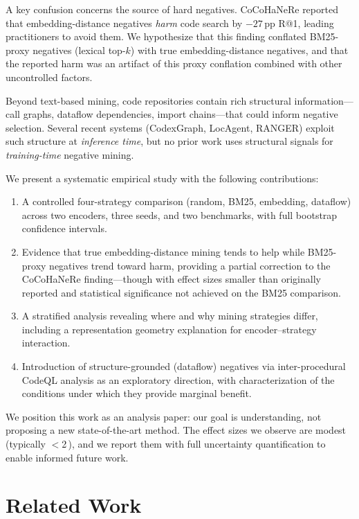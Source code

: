 \documentclass[11pt]{article}
\newcommand{\pp}{\,\text{pp}}
\begin{document}
A key confusion concerns the source of hard negatives.
CoCoHaNeRe reported that embedding-distance negatives \emph{harm} code search by $-27\pp{}$ R@1, leading practitioners to avoid them.
We hypothesize that this finding conflated BM25-proxy negatives (lexical top-$k$) with true embedding-distance negatives, and that the reported harm was an artifact of this proxy conflation combined with other uncontrolled factors.

Beyond text-based mining, code repositories contain rich structural information---call graphs, dataflow dependencies, import chains---that could inform negative selection.
Several recent systems (CodexGraph, LocAgent, RANGER) exploit such structure at \emph{inference time}, but no prior work uses structural signals for \emph{training-time} negative mining.

We present a systematic empirical study with the following contributions:
\begin{enumerate}
    \item A controlled four-strategy comparison (random, BM25, embedding, dataflow) across two encoders, three seeds, and two benchmarks, with full bootstrap confidence intervals.
    \item Evidence that true embedding-distance mining tends to help while BM25-proxy negatives trend toward harm, providing a partial correction to the CoCoHaNeRe finding---though with effect sizes smaller than originally reported and statistical significance not achieved on the BM25 comparison.
    \item A stratified analysis revealing where and why mining strategies differ, including a representation geometry explanation for encoder--strategy interaction.
    \item Introduction of structure-grounded (dataflow) negatives via inter-procedural CodeQL analysis as an exploratory direction, with characterization of the conditions under which they provide marginal benefit.
\end{enumerate}

We position this work as an analysis paper: our goal is understanding, not proposing a new state-of-the-art method.
The effect sizes we observe are modest (typically $<$2\pp{}), and we report them with full uncertainty quantification to enable informed future work.

\section{Related Work}
\label{sec:related}
\end{document}
